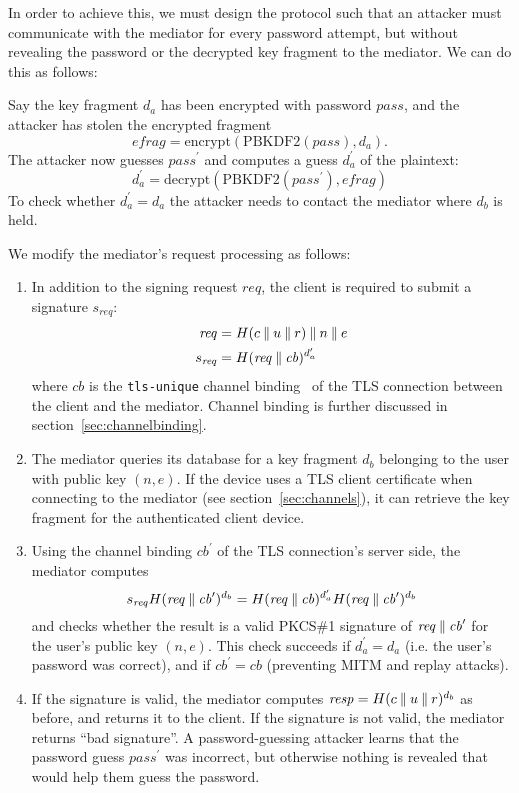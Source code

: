 In order to achieve this, we must design the protocol such that an attacker must communicate with
the mediator for every password attempt, but without revealing the password or the decrypted key
fragment to the mediator. We can do this as follows:

Say the key fragment $d_a$ has been encrypted with password $\mathit{pass}$, and the attacker has
stolen the encrypted fragment
$$\mathit{efrag} = \mathrm{encrypt}(\mathrm{PBKDF2}(\mathit{pass}), d_a).$$
The attacker now guesses $\mathit{pass}^\prime$ and computes a guess $d_a^\prime$ of the plaintext:
$$d_a^\prime = \mathrm{decrypt}(\mathrm{PBKDF2}(\mathit{pass}^\prime), \mathit{efrag})$$
To check whether $d_a^\prime = d_a$ the attacker needs to contact the mediator where $d_b$ is held.

We modify the mediator's request processing as follows:
\begin{enumerate}
\item In addition to the signing request $\mathit{req}$, the client is required to submit a
signature $s_\mathit{req}$:
\begin{align*}
    \mathit{req} &= H(c \mathbin{\|} u \mathbin{\|} r) \mathbin{\|} n \mathbin{\|} e \\
    s_\mathit{req} &= H(\mathit{req} \mathbin{\|} \mathit{cb})^{d_a^\prime}
\end{align*}
where $\mathit{cb}$ is the \texttt{tls-unique} channel binding~\cite{ChannelBinding}
of the TLS connection between the client and the mediator. Channel binding is further discussed in
section~\ref{sec:channelbinding}.
\item The mediator queries its database for a key fragment $d_b$ belonging to the user with public
key $(n, e)$. If the device uses a TLS client certificate when connecting to the mediator (see
section~\ref{sec:channels}), it can retrieve the key fragment for the authenticated client device.
\item Using the channel binding $\mathit{cb}^\prime$ of the TLS connection's server side, the
mediator computes
$$s_\mathit{req} H(\mathit{req} \mathbin{\|} \mathit{cb}^\prime)^{d_b} =
  H(\mathit{req} \mathbin{\|} \mathit{cb})^{d_a^\prime} H(\mathit{req} \mathbin{\|} \mathit{cb}^\prime)^{d_b}$$
and checks whether the result is a valid PKCS\#1 signature of
$\mathit{req} \mathbin{\|} \mathit{cb}^\prime$ for the user's public key $(n, e)$. This check succeeds if
$d_a^\prime = d_a$ (i.e. the user's password was correct), and if $\mathit{cb}^\prime = \mathit{cb}$
(preventing MITM and replay attacks).
\item If the signature is valid, the mediator computes
$\mathit{resp} = H(c \mathbin{\|} u \mathbin{\|} r)^{d_b}$ as before, and returns it to the client. If the
signature is not valid, the mediator returns ``bad signature''. A password-guessing attacker learns
that the password guess $\mathit{pass}^\prime$ was incorrect, but otherwise nothing is revealed that
would help them guess the password.
\end{enumerate}


